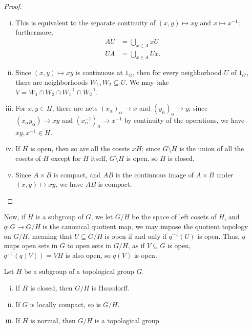 \documentclass[10pt]{mypackage}
\begin{document}
\begin{proof}\hfill
  \begin{enumerate}[(i)]
    \item This is equivalent to the separate continuity of $\left( x,y \right)\mapsto xy$ and $x\mapsto x^{-1}$; furthermore, 
      \begin{align*}
        AU &= \bigcup_{x\in A} xU\\
        UA &= \bigcup_{x\in A}Ux.
      \end{align*}
    \item Since $\left( x,y \right)\mapsto xy$ is continuous at $1_G$, then for every neighborhood $U$ of $1_G$, there are neighborhoods $W_1,W_2\subseteq U$. We may take $V = W_1\cap W_2\cap W_1^{-1}\cap W_2^{-1}$.
    \item For $x,y\in \overline{H}$, there are nets $\left( x_{\alpha} \right)_{\alpha}\rightarrow x$ and $\left( y_{\alpha} \right)_{\alpha}\rightarrow y$; since $\left( x_{\alpha}y_{\alpha} \right)\rightarrow xy$ and $\left( x_{\alpha}^{-1} \right)_{\alpha}\rightarrow x^{-1}$ by continuity of the operations, we have $xy,x^{-1}\in \overline{H}$.
    \item If $H$ is open, then so are all the cosets $xH$; since $G\setminus H$ is the union of all the cosets of $H$ except for $H$ itself, $G\setminus H$ is open, so $H$ is closed.
    \item Since $A\times B$ is compact, and $AB$ is the continuous image of $A\times B$ under $\left( x,y \right)\mapsto xy$, we have $AB$ is compact.
  \end{enumerate}
\end{proof}
Now, if $H$ is a subgroup of $G$, we let $G/H$ be the space of left cosets of $H$, and $q\colon G\rightarrow G/H$ is the canonical quotient map, we may impose the quotient topology on $G/H$, meaning that $U\subseteq G/H$ is open if and only if $q^{-1}(U)$ is open. Thus, $q$ maps open sets in $G$ to open sets in $G/H$, as if $V\subseteq G$ is open, $q^{-1}\left(q(V)\right) = VH$ is also open, so $q(V)$ is open.
\begin{proposition}
  Let $H$ be a subgroup of a topological group $G$.
  \begin{enumerate}[(i)]
    \item If $H$ is closed, then $G/H$ is Hausdorff.
    \item If $G$ is locally compact, so is $G/H$.
    \item If $H$ is normal, then $G/H$ is a topological group.
  \end{enumerate}
\end{proposition}
\end{document}
